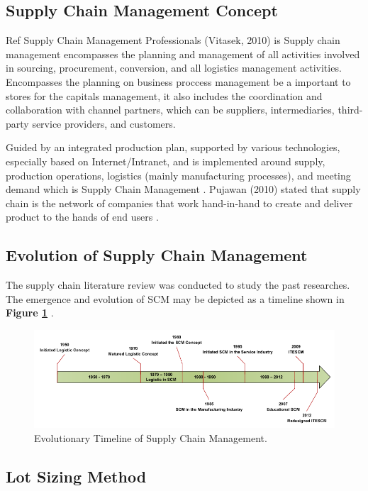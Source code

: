 \documentclass[12pt,a4paper,final]{iopart}
\begin{document}
\subsection{Supply Chain Management Concept}

Ref \cite{Liu2011a} Supply Chain Management Professionals (Vitasek, 2010) is Supply chain management encompasses the planning and management of all activities involved in sourcing, procurement, conversion, and all logistics management activities. Encompasses the planning on business proccess management be a important to stores for the capitals management, it also includes the coordination and collaboration with channel partners, which can be suppliers, intermediaries, third-party service providers, and customers.

Guided by an integrated production plan, supported by various technologies, especially based on Internet/Intranet, and is implemented around supply, production operations, logistics (mainly manufacturing processes), and meeting demand which is Supply Chain Management \cite{Li2018}. Pujawan (2010) stated that supply chain is the network of companies that work hand-in-hand to create and deliver product to the hands of end users \cite{Sampouw}.

\subsection{Evolution of Supply Chain Management}
The supply chain literature review was conducted to study the past researches. The emergence and evolution of SCM may be depicted as a timeline shown in \textbf{Figure \ref{figureEvolution}} \cite{Habib2019}.

\begin{figure}[htb!]
	\centering
	\includegraphics[width=1.0\textwidth]
		{evolution.png}
	\caption{\label{figureEvolution}Evolutionary Timeline of Supply Chain Management.}
\end{figure}

\subsection{Lot Sizing Method}
\end{document}
